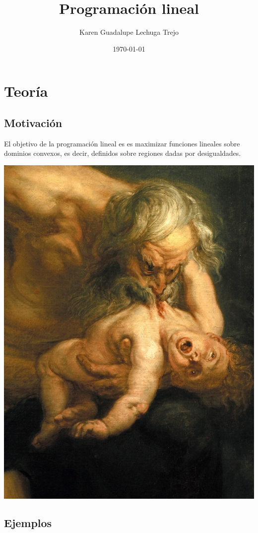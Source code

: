 \documentclass[11pt]{article}
\author{Karen Guadalupe Lechuga Trejo}
\date{\today}
\title{Programación lineal}
\begin{document}
\maketitle
\tableofcontents


\section{Teoría}
\label{sec:org111e85b}
\subsection{Motivación}
\label{sec:org66a6663}

El objetivo de la programación lineal es es maximizar funciones
lineales sobre dominios convexos, es decir, definidos sobre regiones
dadas por desigualdades.

\begin{center}
\includegraphics[width=.9\linewidth]{Rubens-Saturno-detalle.jpg}
\end{center}

\subsection{Ejemplos}
\label{sec:org011a75a}
\end{document}
